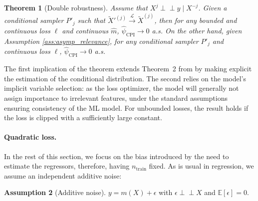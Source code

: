 \documentclass{article}
\theoremstyle{plain}
\newtheorem{theorem}{Theorem}[section]
\theoremstyle{definition}
\newtheorem{assumption}[theorem]{Assumption}
\theoremstyle{remark}
\newcommand{\e}[1]{\mathbb{E}\left[#1\right]  } %
\newcommand{\indep}{\perp\!\!\!\perp}
\begin{document}
\begin{theorem}[Double robustness]\label{th:doubleRobust}
Assume that $X^j \indep y \mid X^{-j}$. Given a conditional sampler $P'_j$ such that $\widetilde{X}'^{(j)} \overset{\mathcal{L}}{\to} \widetilde{X}^{(j)}$, then for any bounded and continuous loss $\ell$ and continuous $\widehat{m}$, $\widehat{\psi}_\mathrm{CPI}\to 0$ a.s. 
On the other hand, given Assumption \ref{ass:asymp_relevance}, for any conditional sampler $P'_j$ and continuous loss $\ell$, $\widehat{\psi}_\mathrm{CPI} \to 0$ a.s.
\end{theorem}




The first implication of the theorem extends Theorem~2 from \citet{Koenig2021Relative} by making explicit the estimation of the conditional distribution. The second relies on the model's implicit variable selection: as the loss optimizer, the model will generally not assign importance to irrelevant features, under the standard assumptions ensuring consistency of the ML model. For unbounded losses, the result holds if the loss is clipped with a sufficiently large constant.


\paragraph{Quadratic loss.} In the rest of this section, we focus on the bias introduced by the need to estimate the regressors, therefore, having $n_\mathrm{train}$ fixed.
As is usual in regression, we assume an independent additive noise:

\begin{assumption}[Additive noise]
    $y=m(X)+\epsilon$ with $\epsilon\perp\!\!\!\perp X$ and $\e{\epsilon}=0$.\label{ass:regressModel}
\end{assumption}
\end{document}
